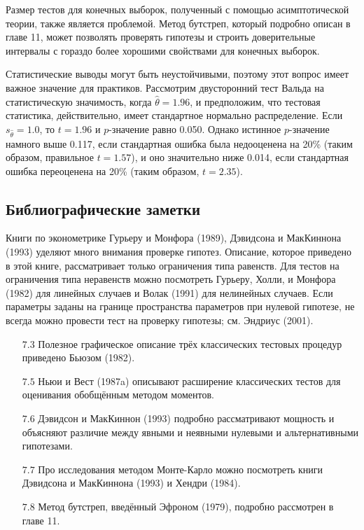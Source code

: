 Размер тестов для конечных выборок, полученный с помощью асимптотической теории, также является проблемой. Метод бутстреп, который подробно описан в главе 11, может позволять проверять гипотезы и строить доверительные интервалы с гораздо более хорошими свойствами для конечных выборок.

Статистические выводы могут быть неустойчивыми, поэтому этот вопрос имеет важное значение для практиков. Рассмотрим двусторонний тест Вальда на статистическую значимость, когда $\hat{\theta} = 1.96$, и предположим, что тестовая статистика, действительно, имеет стандартное нормально распределение. Если $s_{\hat{\theta}} = 1.0$, то $t = 1.96$ и $p$-значение равно 0.050. Однако истинное $p$-значение намного выше 0.117, если стандартная ошибка была недооценена на 20\% (таким образом, правильное $t = 1.57$), и оно значительно ниже 0.014, если стандартная ошибка переоценена на 20\% (таким образом, $t = 2.35$).

\subsection{Библиографические заметки}

Книги по эконометрике Гурьеру и Монфора (1989), Дэвидсона и МакКиннона (1993) уделяют много внимания проверке гипотез. Описание, которое приведено в этой книге, рассматривает только ограничения типа равенств. Для тестов на ограничения типа неравенств можно посмотреть Гурьеру, Холли, и Монфора (1982) для линейных случаев и Волак (1991) для нелинейных случаев. Если параметры заданы на границе пространства параметров при нулевой гипотезе, не всегда можно провести тест на проверку гипотезы; см. Эндриус (2001).
\begin{itemize}
\item [$7.3$] Полезное графическое описание трёх классических тестовых процедур приведено Бьюзом (1982).
\item [$7.5$] Ньюи и Вест (1987a) описывают расширение классических тестов для оценивания обобщённым методом моментов.
\item [$7.6$] Дэвидсон и МакКиннон (1993) подробно рассматривают мощность и объясняют различие между явными и неявными нулевыми и альтернативными гипотезами.
\item [$7.7$] Про исследования методом Монте-Карло можно посмотреть книги Дэвидсона и МакКиннона (1993) и Хендри (1984). 
\item [$7.8$] Метод бутстреп, введённый Эфроном (1979), подробно рассмотрен в главе 11.
\end{itemize}

